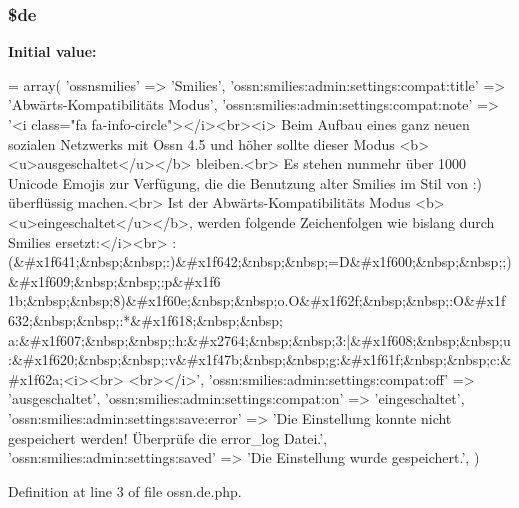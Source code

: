 \subsubsection[{\texorpdfstring{\$de}{$de}}]{\setlength{\rightskip}{0pt plus 5cm}\$de}\hypertarget{components_2_ossn_smilies_2locale_2ossn_8de_8php_aab7de7e51b4580005f63dd4cf5e17311}{}\label{components_2_ossn_smilies_2locale_2ossn_8de_8php_aab7de7e51b4580005f63dd4cf5e17311}
{\bfseries Initial value\+:}
\begin{DoxyCode}
= array(
        \textcolor{stringliteral}{'ossnsmilies'} => \textcolor{stringliteral}{'Smilies'},
        \textcolor{stringliteral}{'ossn:smilies:admin:settings:compat:title'} => \textcolor{stringliteral}{'Abwärts-Kompatibilitäts Modus'},
        \textcolor{stringliteral}{'ossn:smilies:admin:settings:compat:note'} => \textcolor{stringliteral}{'<i class="fa fa-info-circle"></i><br><i>}
\textcolor{stringliteral}{        Beim Aufbau eines ganz neuen sozialen Netzwerks mit Ossn 4.5 und höher sollte dieser Modus
       <b><u>ausgeschaltet</u></b> bleiben.<br>}
\textcolor{stringliteral}{        Es stehen nunmehr über 1000 Unicode Emojis zur Verfügung, die die Benutzung alter Smilies im Stil
       von :) überflüssig machen.<br>}
\textcolor{stringliteral}{        Ist der Abwärts-Kompatibilitäts Modus <b><u>eingeschaltet</u></b>, werden folgende Zeichenfolgen
       wie bislang durch Smilies ersetzt:</i><br>}
\textcolor{stringliteral}{        
      :(&#x1f641;&nbsp;&nbsp;:)&#x1f642;&nbsp;&nbsp;=D&#x1f600;&nbsp;&nbsp;;)&#x1f609;&nbsp;&nbsp;:p&#x1f6
      1b;&nbsp;&nbsp;8)&#x1f60e;&nbsp;&nbsp;o.O&#x1f62f;&nbsp;&nbsp;:O&#x1f632;&nbsp;&nbsp;:*&#x1f618;&nbsp;&nbsp;
      a:&#x1f607;&nbsp;&nbsp;:h:&#x2764;&nbsp;&nbsp;3:|&#x1f608;&nbsp;&nbsp;u:&#x1f620;&nbsp;&nbsp;:v&#x1f47b;&nbsp;&nbsp;g:&#x1f61f;&nbsp;&nbsp;c:&#x1f62a;<i><br>}
\textcolor{stringliteral}{        <br></i>'},
        \textcolor{stringliteral}{'ossn:smilies:admin:settings:compat:off'} => \textcolor{stringliteral}{'ausgeschaltet'},
        \textcolor{stringliteral}{'ossn:smilies:admin:settings:compat:on'} => \textcolor{stringliteral}{'eingeschaltet'},
        \textcolor{stringliteral}{'ossn:smilies:admin:settings:save:error'} => \textcolor{stringliteral}{'Die Einstellung konnte nicht gespeichert werden!
       Überprüfe die error\_log Datei.'},
        \textcolor{stringliteral}{'ossn:smilies:admin:settings:saved'} => \textcolor{stringliteral}{'Die Einstellung wurde gespeichert.'},
)
\end{DoxyCode}


Definition at line 3 of file ossn.\+de.\+php.

